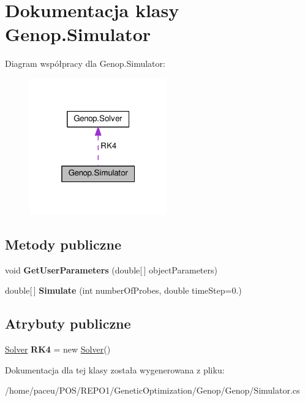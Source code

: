 \hypertarget{classGenop_1_1Simulator}{}\section{Dokumentacja klasy Genop.\+Simulator}
\label{classGenop_1_1Simulator}


Diagram współpracy dla Genop.\+Simulator\+:
\nopagebreak
\begin{figure}[H]
\begin{center}
\leavevmode
\includegraphics[width=169pt]{de/dcf/classGenop_1_1Simulator__coll__graph}
\end{center}
\end{figure}
\subsection*{Metody publiczne}
\begin{DoxyCompactItemize}
\item 
void {\bfseries Get\+User\+Parameters} (double\mbox{[}$\,$\mbox{]} object\+Parameters)\hypertarget{classGenop_1_1Simulator_a4bed492f372adb3bfb577a5caf7a143a}{}\label{classGenop_1_1Simulator_a4bed492f372adb3bfb577a5caf7a143a}

\item 
double\mbox{[}$\,$\mbox{]} {\bfseries Simulate} (int number\+Of\+Probes, double time\+Step=0.)\hypertarget{classGenop_1_1Simulator_ac3228946a174bafc232038ee2f74141c}{}\label{classGenop_1_1Simulator_ac3228946a174bafc232038ee2f74141c}

\end{DoxyCompactItemize}
\subsection*{Atrybuty publiczne}
\begin{DoxyCompactItemize}
\item 
\hyperlink{classGenop_1_1Solver}{Solver} {\bfseries R\+K4} = new \hyperlink{classGenop_1_1Solver}{Solver}()\hypertarget{classGenop_1_1Simulator_af3757fb33e92dbf3a883156d7289d6ec}{}\label{classGenop_1_1Simulator_af3757fb33e92dbf3a883156d7289d6ec}

\end{DoxyCompactItemize}


Dokumentacja dla tej klasy została wygenerowana z pliku\+:\begin{DoxyCompactItemize}
\item 
/home/paceu/\+P\+O\+S/\+R\+E\+P\+O1/\+Genetic\+Optimization/\+Genop/\+Genop/Simulator.\+cs\end{DoxyCompactItemize}
